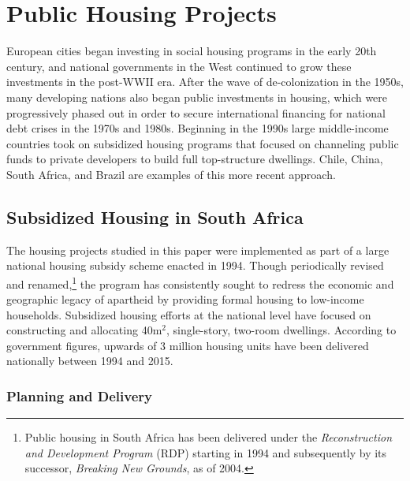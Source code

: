 \documentclass[12pt]{article}
\begin{document}




\section{Public Housing Projects}\label{section:background}


European cities began investing in social housing programs in the early 20th century, and national governments in the West continued to grow these investments in the post-WWII era. After the wave of de-colonization in the 1950s, many developing nations also began public investments in housing, which were progressively phased out in order to secure international financing for national debt crises in the 1970s and 1980s. Beginning in the 1990s large middle-income countries took on subsidized housing programs that focused on channeling public funds to private developers to build full top-structure dwellings. Chile, China, South Africa, and Brazil are examples of this more recent approach.


\subsection{Subsidized Housing in South Africa}

The housing projects studied in this paper were implemented as part of a large national housing subsidy scheme enacted in 1994. Though periodically revised and renamed,\footnote{Public housing in South Africa has been delivered under the {\it Reconstruction and Development Program} (RDP) starting in 1994 and subsequently by its successor, {\it Breaking New Grounds}, as of 2004.} the program has consistently sought to redress the economic and geographic legacy of apartheid by providing formal housing to low-income households. Subsidized housing efforts at the national level have focused on constructing and allocating 40m$^2$, single-story, two-room dwellings. According to government figures, upwards of 3 million housing units have been delivered nationally between 1994 and 2015.

\subsubsection{Planning and Delivery}
\end{document}
